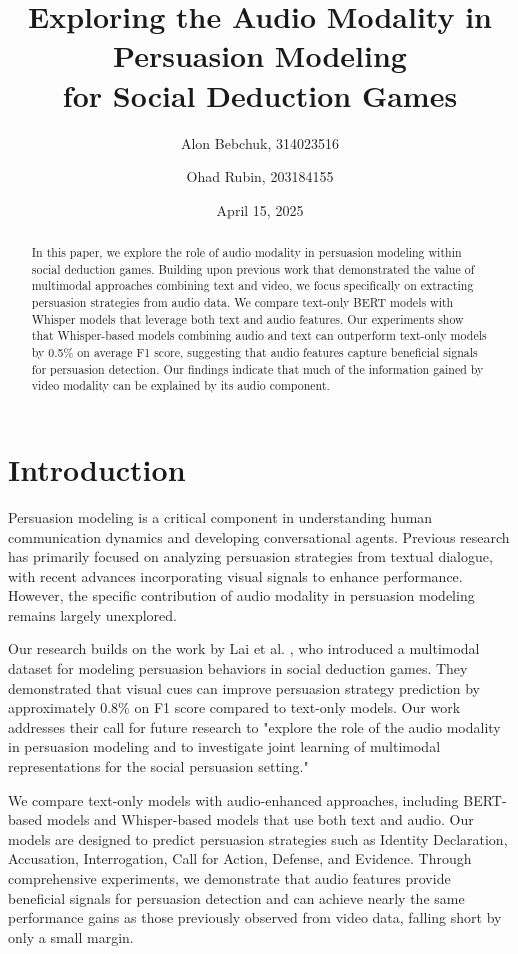 \documentclass{article}
\title{Exploring the Audio Modality in Persuasion Modeling\\
for Social Deduction Games}
\author{Alon Bebchuk, 314023516 \and Ohad Rubin, 203184155}
\date{April 15, 2025}
\begin{document}
\maketitle

\begin{abstract}
In this paper, we explore the role of audio modality in persuasion modeling within social deduction games. Building upon previous work that demonstrated the value of multimodal approaches combining text and video, we focus specifically on extracting persuasion strategies from audio data. We compare text-only BERT models with Whisper models that leverage both text and audio features. Our experiments show that Whisper-based models combining audio and text can outperform text-only models by 0.5\% on average F1 score, suggesting that audio features capture beneficial signals for persuasion detection. Our findings indicate that much of the information gained by video modality can be explained by its audio component.
\end{abstract}

\section{Introduction}
Persuasion modeling is a critical component in understanding human communication dynamics and developing conversational agents. Previous research has primarily focused on analyzing persuasion strategies from textual dialogue, with recent advances incorporating visual signals to enhance performance. However, the specific contribution of audio modality in persuasion modeling remains largely unexplored.

Our research builds on the work by Lai et al. \cite{lai2022werewolf}, who introduced a multimodal dataset for modeling persuasion behaviors in social deduction games. They demonstrated that visual cues can improve persuasion strategy prediction by approximately 0.8\% on F1 score compared to text-only models. Our work addresses their call for future research to "explore the role of the audio modality in persuasion modeling and to investigate joint learning of multimodal representations for the social persuasion setting."

We compare text-only models with audio-enhanced approaches, including BERT-based models and Whisper-based models that use both text and audio. Our models are designed to predict persuasion strategies such as Identity Declaration, Accusation, Interrogation, Call for Action, Defense, and Evidence. Through comprehensive experiments, we demonstrate that audio features provide beneficial signals for persuasion detection and can achieve nearly the same performance gains as those previously observed from video data, falling short by only a small margin.
\end{document}
